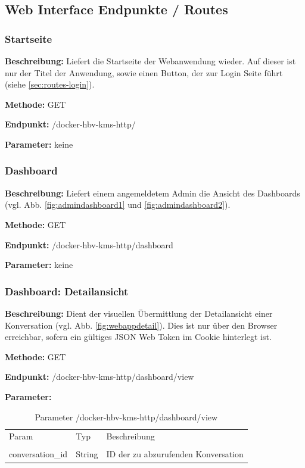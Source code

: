 \subsection{Web Interface Endpunkte / Routes}
\label{sec:routes}
\dotfill
\subsubsection{Startseite}
\label{sec:routes-start}
\textbf{Beschreibung:} Liefert die Startseite der Webanwendung wieder. Auf dieser ist nur der Titel der Anwendung, sowie einen Button, der zur Login Seite führt (siehe \ref{sec:routes-login}).

\textbf{Methode:} GET

\textbf{Endpunkt:} /docker-hbv-kms-http/

\textbf{Parameter:}
keine

\dotfill

\subsubsection{Dashboard}
\label{sec:routes-dashboard}
\textbf{Beschreibung:} Liefert einem angemeldetem Admin die Ansicht des Dashboards (vgl. Abb. \ref{fig:admindashboard1} und \ref{fig:admindashboard2}).

\textbf{Methode:} GET

\textbf{Endpunkt:} /docker-hbv-kms-http/dashboard

\textbf{Parameter:}
keine

\dotfill

\subsubsection{Dashboard: Detailansicht}
\label{sec:routes-dashboard-detail}
\textbf{Beschreibung:} Dient der visuellen Übermittlung der Detailansicht einer Konversation (vgl. Abb. \ref{fig:webappdetail}). Dies ist nur über den Browser erreichbar, sofern ein gültiges JSON Web Token im Cookie hinterlegt ist.

\textbf{Methode:} GET

\textbf{Endpunkt:} /docker-hbv-kms-http/dashboard/view

\textbf{Parameter:}
\begin{table}[H]
    \label{table:/docker-hbv-kms-http/dashboard/view}
    \caption{Parameter /docker-hbv-kms-http/dashboard/view}
    \setlength{\tabcolsep}{3pt}
    \begin{tabular}{p{100pt}p{80pt}p{200pt}}
        \toprule
        Param            & Typ    & Beschreibung                        \\                                                             \\
        \midrule
        conversation\_id & String & ID der zu abzurufenden Konversation \\
        \bottomrule
    \end{tabular}
\end{table}
\dotfill

